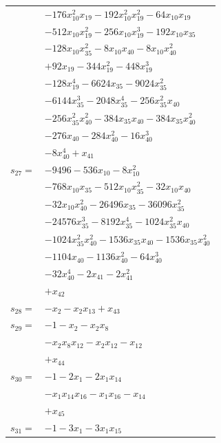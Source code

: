 \begin{longtable}{@{}r@{\;}l@{}}
 & \(\displaystyle -176x_{10}^{2}x_{19} -192x_{10}^{2}x_{19}^{2} -64x_{10}x_{19}\) \\
 & \(\displaystyle -512x_{10}x_{19}^{2} -256x_{10}x_{19}^{3} -192x_{10}x_{35}\) \\
 & \(\displaystyle -128x_{10}x_{35}^{2} -8x_{10}x_{40} -8x_{10}x_{40}^{2}\) \\
 & \(\displaystyle +92x_{19} -344x_{19}^{2} -448x_{19}^{3}\) \\
 & \(\displaystyle -128x_{19}^{4} -6624x_{35} -9024x_{35}^{2}\) \\
 & \(\displaystyle -6144x_{35}^{3} -2048x_{35}^{4} -256x_{35}^{2}x_{40}\) \\
 & \(\displaystyle -256x_{35}^{2}x_{40}^{2} -384x_{35}x_{40} -384x_{35}x_{40}^{2}\) \\
 & \(\displaystyle -276x_{40} -284x_{40}^{2} -16x_{40}^{3}\) \\
 & \(\displaystyle -8x_{40}^{4} +x_{41}\) \\[3pt]
\(s_{27}=\) & \(\displaystyle -9496 -536x_{10} -8x_{10}^{2}\) \\
 & \(\displaystyle -768x_{10}x_{35} -512x_{10}x_{35}^{2} -32x_{10}x_{40}\) \\
 & \(\displaystyle -32x_{10}x_{40}^{2} -26496x_{35} -36096x_{35}^{2}\) \\
 & \(\displaystyle -24576x_{35}^{3} -8192x_{35}^{4} -1024x_{35}^{2}x_{40}\) \\
 & \(\displaystyle -1024x_{35}^{2}x_{40}^{2} -1536x_{35}x_{40} -1536x_{35}x_{40}^{2}\) \\
 & \(\displaystyle -1104x_{40} -1136x_{40}^{2} -64x_{40}^{3}\) \\
 & \(\displaystyle -32x_{40}^{4} -2x_{41} -2x_{41}^{2}\) \\
 & \(\displaystyle +x_{42}\) \\[3pt]
\(s_{28}=\) & \(\displaystyle -x_{2} -x_{2}x_{13} +x_{43}\) \\[3pt]
\(s_{29}=\) & \(\displaystyle -1 -x_{2} -x_{2}x_{8}\) \\
 & \(\displaystyle -x_{2}x_{8}x_{12} -x_{2}x_{12} -x_{12}\) \\
 & \(\displaystyle +x_{44}\) \\[3pt]
\(s_{30}=\) & \(\displaystyle -1 -2x_{1} -2x_{1}x_{14}\) \\
 & \(\displaystyle -x_{1}x_{14}x_{16} -x_{1}x_{16} -x_{14}\) \\
 & \(\displaystyle +x_{45}\) \\[3pt]
\(s_{31}=\) & \(\displaystyle -1 -3x_{1} -3x_{1}x_{15}\) \\

\end{longtable}
